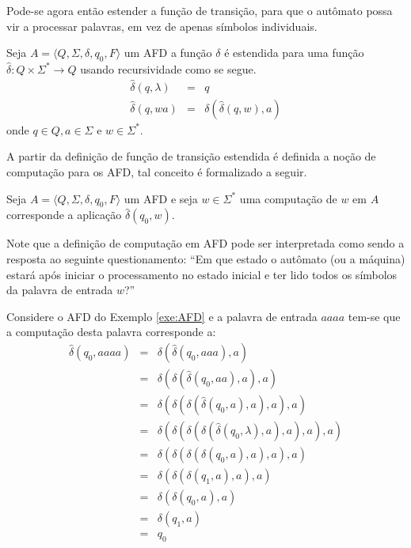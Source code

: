 Pode-se agora então estender a função de transição, para que o autômato possa vir a processar palavras, em vez de apenas símbolos individuais.

\begin{definicao}\label{def:DeltaEstendido}
	Seja $A = \langle Q, \Sigma, \delta, q_0, F\rangle$ um AFD a função $\delta$ é estendida para uma função $\widehat{\delta}: Q \times \Sigma^* \rightarrow Q$ usando recursividade como se segue.
	\begin{eqnarray}\label{eq:ExtensaoDaFuncaoTransicaoDelta}
		\widehat{\delta}(q, \lambda)& = & q \\
		\widehat{\delta}(q, wa)& = & \delta(\widehat{\delta}(q, w), a)	
	\end{eqnarray}
	onde $q \in Q, a \in \Sigma$ e $w \in \Sigma^*$.
\end{definicao}

A partir da definição de função de transição estendida é definida  a noção de computação para os AFD, tal conceito é formalizado a seguir.

\begin{definicao}\label{def:ComputacaoAFD}
	Seja $A = \langle Q, \Sigma, \delta, q_0, F\rangle$ um AFD e seja $w \in \Sigma^*$ uma computação de $w$ em $A$ corresponde a aplicação $\widehat{\delta}(q_0, w)$.
\end{definicao}

Note que a definição de computação em AFD pode ser interpretada como sendo a resposta ao seguinte questionamento: ``Em que estado o autômato (ou a máquina) estará após iniciar o processamento no estado inicial e ter lido todos os símbolos da palavra de entrada $w$?''

\begin{exemplo}\label{exe:ComputacaoAFD1}
	Considere o AFD do Exemplo \ref{exe:AFD} e a palavra de entrada $aaaa$ tem-se que a computação desta palavra corresponde a:
	\begin{eqnarray*}
		\widehat{\delta}(q_0, aaaa) & = & \delta(\widehat{\delta}(q_0, aaa), a)\\
		& = & \delta(\delta(\widehat{\delta}(q_0, aa), a), a)\\
		& = & \delta(\delta(\delta(\widehat{\delta}(q_0, a), a), a), a)\\
		& = & \delta(\delta(\delta(\delta(\widehat{\delta}(q_0, \lambda), a), a), a), a)\\
		& = & \delta(\delta(\delta(\delta(q_0, a), a), a), a)\\
		& = & \delta(\delta(\delta(q_1, a), a), a)\\
		& = & \delta(\delta(q_0, a), a)\\
		& = & \delta(q_1, a)\\
		& = & q_0
	\end{eqnarray*}
\end{exemplo}

